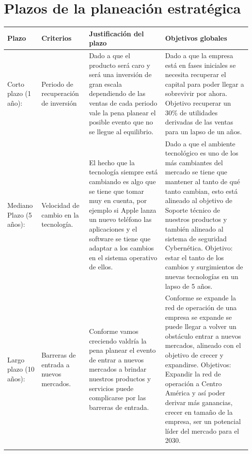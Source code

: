\documentclass{article}
\begin{document}
\section{Plazos de la planeación estratégica}
\begin{center}
    \begin{supertabular}{ |p{2cm}|p{2cm}|p{5cm}|p{5cm}| }
        \hline
            Plazo & Criterios & Justificación del plazo & Objetivos globales\\
        \hline
            Corto plazo (1 año): 
            & 
            Periodo de recuperación de inversión
            & 
            Dado a que el producto será caro y será una inversión de gran escala dependiendo de las ventas de cada periodo vale la pena planear el posible evento que no se llegue al equilibrio.
            & 
            Dado a que la empresa está en fases iniciales se necesita recuperar el capital para poder llegar a sobrevivir por ahora. Objetivo recuperar un 30\% de utilidades derivadas de las ventas para un lapso de un años.
            \\ 
        \hline
            Mediano Plazo (5 años):
            & 
            Velocidad de cambio en la tecnología.
            & 
            El hecho que la tecnología siempre está cambiando es algo que se tiene que tomar muy en cuenta, por ejemplo si Apple lanza un nuevo teléfono las aplicaciones y el software se tiene que adaptar a los cambios en el sistema operativo de ellos.
            & 
            Dado a que el ambiente tecnológico es uno de los más cambiantes del mercado se tiene que mantener al tanto de qué tanto cambian, esto está alineado al objetivo de Soporte técnico de nuestros productos y también alineado al sistema de seguridad Cybernética. Objetivo: estar el tanto de los cambios y surgimientos de nuevas tecnologías en un lapso de 5 años.
            \\ 
        \hline
            Largo plazo (10 años): 
            & 
            Barreras de entrada a nuevos mercados.
            & 
            Conforme vamos creciendo valdría la pena planear el evento de entrar a nuevos mercados a brindar nuestros productos y servicios puede complicarse por las barreras de entrada. 
            & 
            Conforme se expande la red de operación de una empresa se expande se puede llegar a volver un obstáculo entrar a nuevos mercados, alineado con el objetivo de crecer y expandirse. Objetivos: Expandir la red de operación a Centro América y así poder derivar más ganancias, crecer en tamaño de la empresa, ser un potencial líder del mercado para el 2030.
            \\ 
          \\
    \end{supertabular}
\end{center}
\end{document}
